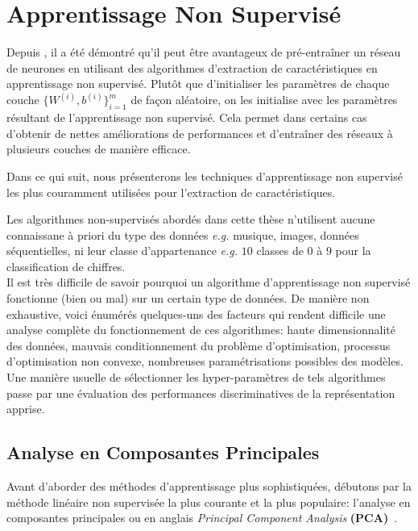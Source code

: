 \section{Apprentissage Non Supervisé}

Depuis \citep{Hinton06,Bengio-nips-2006}, il a été démontré qu'il peut être
avantageux de pré-entraîner un réseau de neurones en utilisant des algorithmes
d'extraction de caractéristiques en apprentissage non supervisé. Plutôt que
d'initialiser les paramètres de chaque couche $\lbrace W^{(i)},b^{(i)}
\rbrace_{i=1}^{m}$ de façon aléatoire, on les initialise avec les paramètres
résultant de l'apprentissage non supervisé.  Cela permet dans certains cas
d'obtenir de nettes améliorations de performances et d'entraîner des réseaux à
plusieurs couches de manière efficace.

Dans ce qui suit, nous présenterons les techniques d'apprentissage non
supervisé les plus couramment utilisées pour l'extraction de caractéristiques.

Les algorithmes non-supervisés abordés dans cette thèse n'utilisent aucune connaissane à priori du type des données
\textit{e.g.} musique, images, données séquentielles, ni leur classe
d'appartenance \textit{e.g.} $10$ classes de $0$ à $9$ pour la classification
de chiffres.  \\

Il est très difficile de savoir pourquoi un algorithme d'apprentissage non
supervisé fonctionne (bien ou mal) sur un certain type de données.  De manière
non exhaustive, voici énumérés quelques-uns des facteurs qui rendent difficile
une analyse complète du fonctionnement de ces algorithmes: haute
dimensionnalité des données, mauvais conditionnement du problème
d'optimisation, processus d'optimisation non convexe, nombreuses
paramétrisations possibles des modèles. \\

Une manière usuelle de sélectionner les hyper-paramètres de tels algorithmes passe 
par une évaluation des performances discriminatives de la
représentation apprise.

\subsection{Analyse en Composantes Principales} \label{sec:pca}

Avant d'aborder des méthodes d'apprentissage plus sophistiquées, débutons par  
la méthode linéaire non supervisée la plus courante et la plus
populaire: l'analyse en composantes principales ou en anglais \textit{Principal
Component Analysis} \textbf{(PCA)}~\citep{Pearson-1901,Hotelling1933}.

